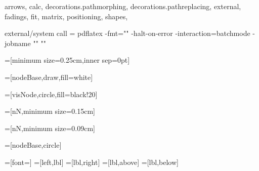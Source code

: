 %

\usepackage{tikz}

\usetikzlibrary
{
    arrows,
    calc,
    decorations.pathmorphing,
    decorations.pathreplacing,
    external,
    fadings,
    fit,
    matrix,
    positioning,
    shapes,
}

\tikzset{external/up to date check=md5}

\tikzset
{
    external/system call =
    {
        pdflatex
            -fmt="\fmt"
            \tikzexternalcheckshellescape
            -halt-on-error
            -interaction=batchmode
            -jobname "\image" "\texsource"
    }
}




=[minimum size=0.25cm,inner sep=0pt]

=[nodeBase,draw,fill=white]

=[visNode,circle,fill=black!20]

=[nN,minimum size=0.15cm]

=[nN,minimum size=0.09cm]

=[nodeBase,circle]

=[font=\small]
=[left,lbl]
=[lbl,right]
=[lbl,above]
=[lbl,below]
